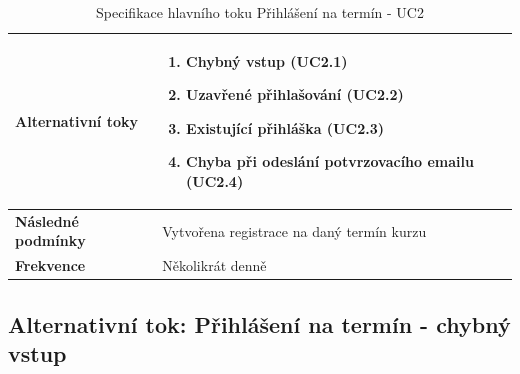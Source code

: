 \documentclass[12pt,a4paper,titlepage,final]{report}
\begin{document}
\begin{table}[!h]
\begin{center}
\begin{tabular}{ | p{4.5cm} | p{13cm} | }
    \textbf{Alternativní toky} & 
    \vspace{-3.5mm}
    \begin{enumerate}
	    \itemsep0em
     	\item Chybný vstup (UC2.1)
	    \item Uzavřené přihlašování (UC2.2)
    	\item Existující přihláška (UC2.3)
	    \item Chyba při odeslání potvrzovacího emailu (UC2.4)
    \end{enumerate}
	   
    \\ \hline
    
    \textbf{Následné podmínky} & Vytvořena registrace na daný termín kurzu
    \\ \hline        
    
	\textbf{Frekvence} & Několikrát denně
	\\ \hline
		
    \end{tabular}
	\caption{Specifikace hlavního toku Přihlášení na termín - UC2}    
	\end{center}

\end{table}

\newpage

\subsection{Alternativní tok: Přihlášení na termín - chybný vstup}
\end{document}
